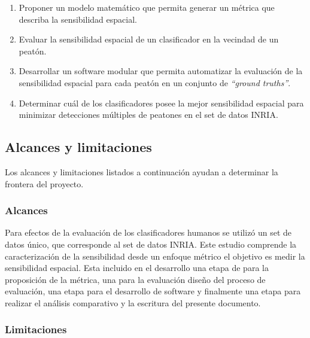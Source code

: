 \begin{enumerate}

\item Proponer un modelo matemático que permita generar un métrica que describa la sensibilidad espacial.
\item Evaluar la sensibilidad espacial de un clasificador en la vecindad de un peatón.
\item Desarrollar un software modular que permita automatizar la evaluación de la sensibilidad espacial para cada peatón en un conjunto de \textit{``ground truths''}. 
\item Determinar cuál de los clasificadores posee la mejor sensibilidad espacial para minimizar detecciones múltiples de peatones en el set de datos INRIA.

\end{enumerate}

\subsection{Alcances y limitaciones}

Los alcances y limitaciones listados a continuación ayudan a determinar la frontera del proyecto. 

\subsubsection{Alcances}

Para efectos de la evaluación de los clasificadores humanos se utilizó un set de datos único, que corresponde al set de datos INRIA. Este estudio comprende la caracterización de la sensibilidad desde un enfoque métrico \ie el objetivo es medir la sensibilidad espacial. Esta incluido en el desarrollo una etapa de para la proposición de la métrica, una para la evaluación diseño del proceso de evaluación, una etapa para el desarrollo de software y finalmente una etapa para realizar el análisis comparativo y la escritura del presente documento.

\subsubsection{Limitaciones}

